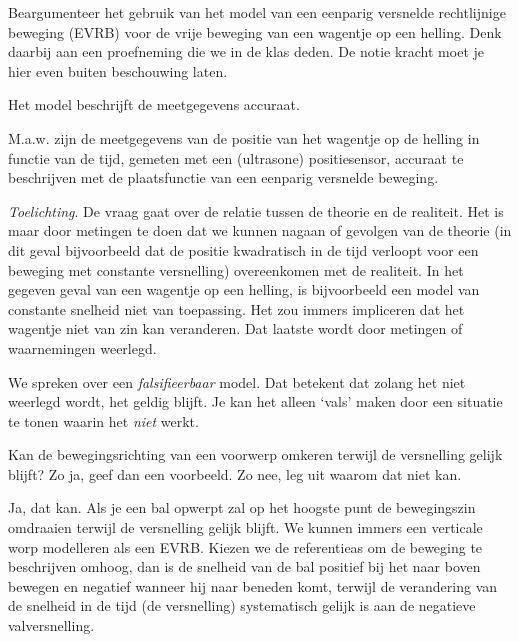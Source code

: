 \documentclass{ximera}
\begin{document}
\begin{exercise}
	Beargumenteer het gebruik van het model van een eenparig versnelde rechtlijnige beweging (EVRB) voor de vrije beweging van een wagentje op een helling. Denk daarbij aan een proefneming die we in de klas deden. De notie kracht moet je hier even buiten beschouwing laten.
	\begin{oplossing}
		Het model beschrijft de meetgegevens accuraat.

		M.a.w. zijn de meetgegevens van de positie van het wagentje op de helling in functie van de tijd, gemeten met een (ultrasone) positiesensor, accuraat te beschrijven met de plaatsfunctie van een eenparig versnelde beweging.

		\emph{Toelichting}.
		De vraag gaat over de relatie tussen de theorie en de realiteit. Het is maar door metingen te doen dat we kunnen nagaan of gevolgen van de theorie (in dit geval bijvoorbeeld dat de positie kwadratisch in de tijd verloopt voor een beweging met constante versnelling) overeenkomen met de realiteit. In het gegeven geval van een wagentje op een helling, is bijvoorbeeld een model van constante snelheid niet van toepassing. Het zou immers impliceren dat het wagentje niet van zin kan veranderen. Dat laatste wordt door metingen of waarnemingen weerlegd.

		We spreken over een \textit{falsifieerbaar} model. Dat betekent dat zolang het niet weerlegd wordt, het geldig blijft. Je kan het alleen `vals' maken door een situatie te tonen waarin het \textit{niet} werkt.
	\end{oplossing} 
\end{exercise}


\begin{exercise}
	Kan de bewegingsrichting van een voorwerp omkeren terwijl de versnelling gelijk blijft? Zo ja, geef dan een voorbeeld. Zo nee, leg uit waarom dat niet kan.
	\begin{oplossing}
		Ja, dat kan. Als je een bal opwerpt zal op het hoogste punt de bewegingszin omdraaien terwijl de versnelling gelijk blijft. We kunnen immers een verticale worp modelleren als een EVRB. Kiezen we de referentieas om de beweging te beschrijven omhoog, dan is de snelheid van de bal positief bij het naar boven bewegen en negatief wanneer hij naar beneden komt, terwijl de verandering van de snelheid in de tijd (de versnelling) systematisch gelijk is aan de negatieve valversnelling.
	\end{oplossing}
\end{exercise}
\end{document}
